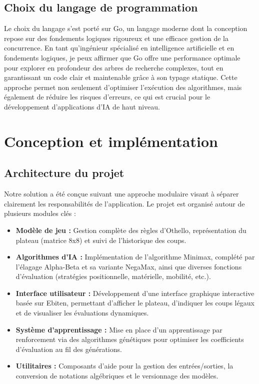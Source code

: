 \documentclass[a4paper,12pt]{article}
\begin{document}
\subsection{Choix du langage de programmation}
Le choix du langage s'est porté sur Go, un langage moderne dont la conception repose sur des fondements logiques rigoureux et une efficace gestion de la concurrence. En tant qu'ingénieur spécialisé en intelligence artificielle et en fondements logiques, je peux affirmer que Go offre une performance optimale pour explorer en profondeur des arbres de recherche complexes, tout en garantissant un code clair et maintenable grâce à son typage statique. Cette approche permet non seulement d'optimiser l'exécution des algorithmes, mais également de réduire les risques d'erreurs, ce qui est crucial pour le développement d'applications d'IA de haut niveau.

\section{Conception et implémentation}
\subsection{Architecture du projet}
Notre solution a été conçue suivant une approche modulaire visant à séparer clairement les responsabilités de l'application. Le projet est organisé autour de plusieurs modules clés :
\begin{itemize}
    \item \textbf{Modèle de jeu :} Gestion complète des règles d'Othello, représentation du plateau (matrice 8x8) et suivi de l'historique des coups.
    \item \textbf{Algorithmes d'IA :} Implémentation de l'algorithme Minimax, complété par l'élagage Alpha-Beta et sa variante NegaMax, ainsi que diverses fonctions d'évaluation (stratégies positionnelle, matérielle, mobilité, etc.).
    \item \textbf{Interface utilisateur :} Développement d'une interface graphique interactive basée sur Ebiten, permettant d'afficher le plateau, d'indiquer les coups légaux et de visualiser les évaluations dynamiques.
    \item \textbf{Système d'apprentissage :} Mise en place d'un apprentissage par renforcement via des algorithmes génétiques pour optimiser les coefficients d'évaluation au fil des générations.
    \item \textbf{Utilitaires :} Composants d'aide pour la gestion des entrées/sorties, la conversion de notations algébriques et le versionnage des modèles.
\end{itemize}
\end{document}
